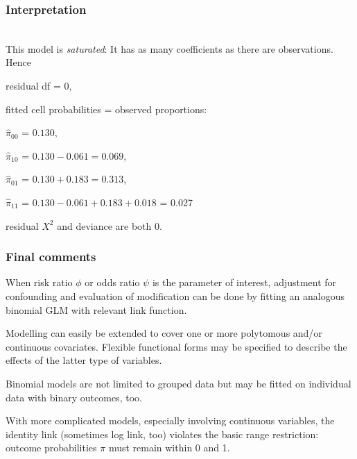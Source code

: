 \documentclass[handout,12pt]{beamer}
\begin{document}
\begin{frame}[fragile] \frametitle{Interpretation}
\ \\
This model is {\it saturated}: It has as many 
coefficients as there are observations. Hence
\bi
\item residual df = 0,
\item fitted cell probabilities = observed proportions:
  \bi 
 \item[]$\widehat\pi_{00}$  = $0.130$, 
 \item[]$\widehat\pi_{10}$  = $0.130 - 0.061 = 0.069$,
 \item[]$\widehat\pi_{01}$  = $0.130 + 0.183 = 0.313$,
 \item[]$\widehat\pi_{11}$  = $0.130 - 0.061 + 0.183 + 0.018$ 
  = 0.027
  \ei
\item residual $X^2$ and deviance are both 0.
\ei
\end{frame} 

\begin{frame}[fragile] \frametitle{Final comments}

\bi
\item When risk ratio $\phi$ or odds ratio $\psi$ is the parameter of interest, adjustment for confounding and evaluation of modification can be done by fitting an analogous binomial GLM with relevant link function.

\item Modelling can easily be extended to cover one or more polytomous and/or continuous covariates.  Flexible functional forms may be specified to describe the effects of the latter type of variables.

\item Binomial models are not limited to grouped data but may be fitted on individual data with binary outcomes, too.

\item With more complicated models, especially involving continuous variables, the identity  link (sometimes log link, too) violates the basic range restriction:\\
outcome probabilities $\pi$ must remain within 0 and 1. 
\ei
\end{frame}

\end{document}
